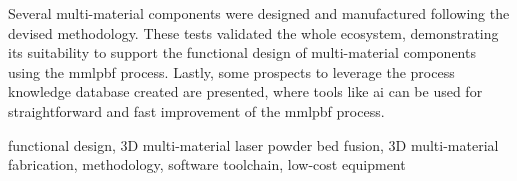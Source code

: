 Several multi-material components were designed and manufactured following the
devised methodology. These tests validated the whole ecosystem, demonstrating
its suitability to support the functional design of multi-material components
using the \gls{mmlpbf} process.
Lastly, some prospects to leverage the process knowledge database created are
presented, where tools like \gls{ai} can be used for straightforward and fast
improvement of the \gls{mmlpbf} process.

\begin{keywords}
functional design, 3D multi-material laser powder bed fusion, 3D multi-material fabrication, methodology,
software toolchain, low-cost equipment
\end{keywords} 
